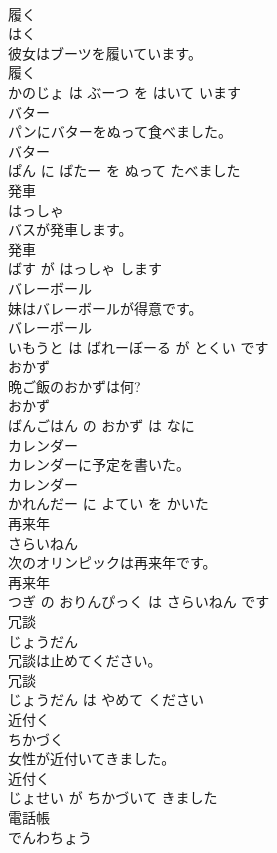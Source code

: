 \documentclass[8pt]{extreport}
\begin{document}
\begin{CJK}{UTF8}{min}
\\	履く	
\\	はく			
\\	彼女はブーツを履いています。	
\\	履く 
\\	かのじょ は ぶーつ を はいて います			
\\	バター	
\\	パンにバターをぬって食べました。	
\\	バター 
\\	ぱん に ばたー を ぬって たべました			
\\	発車	
\\	はっしゃ			
\\	バスが発車します。	
\\	発車 
\\	ばす が はっしゃ します			
\\	バレーボール	
\\	妹はバレーボールが得意です。	
\\	バレーボール 
\\	いもうと は ばれーぼーる が とくい です			
\\	おかず	
\\	晩ご飯のおかずは何?	
\\	おかず 
\\	ばんごはん の おかず は なに			
\\	カレンダー	
\\	カレンダーに予定を書いた。	
\\	カレンダー 
\\	かれんだー に よてい を かいた			
\\	再来年	
\\	さらいねん			
\\	次のオリンピックは再来年です。	
\\	再来年 
\\	つぎ の おりんぴっく は さらいねん です			
\\	冗談	
\\	じょうだん			
\\	冗談は止めてください。	
\\	冗談 
\\	じょうだん は やめて ください			
\\	近付く	
\\	ちかづく			
\\	女性が近付いてきました。	
\\	近付く 
\\	じょせい が ちかづいて きました			
\\	電話帳	
\\	でんわちょう			

\end{CJK}
\end{document}
